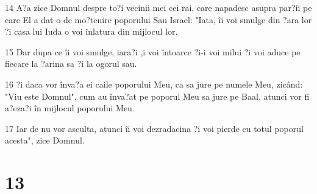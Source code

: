 \par 14 A?a zice Domnul despre to?i vecinii mei cei rai, care napadesc asupra par?ii pe care El a dat-o de mo?tenire poporului Sau Israel: "Iata, îi voi smulge din ?ara lor ?i casa lui Iuda o voi înlatura din mijlocul lor.
\par 15 Dar dupa ce îi voi smulge, iara?i ,i voi întoarce ?i-i voi milui ?i voi aduce pe fiecare la ?arina sa ?i la ogorul sau.
\par 16 ?i daca vor înva?a ei caile poporului Meu, ca sa jure pe numele Meu, zicând: "Viu este Domnul", cum au înva?at pe poporul Meu sa jure pe Baal, atunci vor fi a?eza?i în mijlocul poporului Meu.
\par 17 Iar de nu vor asculta, atunci îi voi dezradacina ?i voi pierde cu totul poporul acesta", zice Domnul.

\chapter{13}

